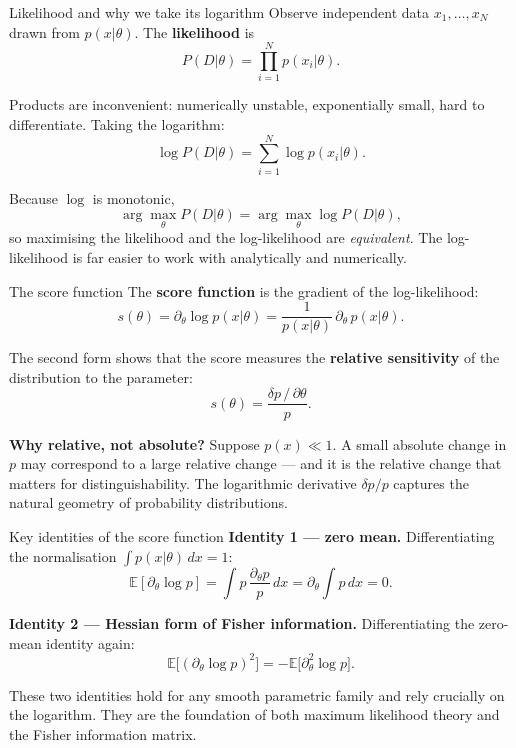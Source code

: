 \documentclass[aspectratio=169]{beamer}
\begin{document}
\begin{frame}{Likelihood and why we take its logarithm}
Observe independent data \(x_1,\dots,x_N\) drawn from \(p(x|\theta)\).
The \textbf{likelihood} is
\[
P(D|\theta)=\prod_{i=1}^N p(x_i|\theta).
\]

Products are inconvenient: numerically unstable, exponentially small,
hard to differentiate.  Taking the logarithm:
\[
\log P(D|\theta)=\sum_{i=1}^N \log p(x_i|\theta).
\]

Because \(\log\) is monotonic,
\[
\arg\max_\theta P(D|\theta)
=\arg\max_\theta \log P(D|\theta),
\]
so maximising the likelihood and the log-likelihood are \emph{equivalent}.
The log-likelihood is far easier to work with analytically and numerically.
\end{frame}


\begin{frame}{The score function}
The \textbf{score function} is the gradient of the log-likelihood:
\[
s(\theta)
=\partial_\theta \log p(x|\theta)
=\frac{1}{p(x|\theta)}\,\partial_\theta\, p(x|\theta).
\]

The second form shows that the score measures the
\textbf{relative sensitivity} of the distribution to the parameter:
\[
s(\theta)=\frac{\delta p\,/\,\partial\theta}{p}.
\]

\medskip

\textbf{Why relative, not absolute?}
Suppose \(p(x)\ll 1\).  A small absolute change in \(p\) may
correspond to a large relative change — and it is the relative
change that matters for distinguishability.
The logarithmic derivative \(\delta p/p\) captures the natural
geometry of probability distributions.
\end{frame}

\begin{frame}{Key identities of the score function}
\textbf{Identity 1 — zero mean.}
Differentiating the normalisation \(\int p(x|\theta)\,dx=1\):
\[
\mathbb{E}[\partial_\theta \log p]
=\int p\,\frac{\partial_\theta p}{p}\,dx
=\partial_\theta\!\int p\,dx=0.
\]

\textbf{Identity 2 — Hessian form of Fisher information.}
Differentiating the zero-mean identity again:
\[
\mathbb{E}\bigl[(\partial_\theta \log p)^2\bigr]
=-\mathbb{E}\bigl[\partial_\theta^2 \log p\bigr].
\]

\medskip

These two identities hold for any smooth parametric family and rely
crucially on the logarithm.  They are the foundation of both maximum
likelihood theory and the Fisher information matrix.
\end{frame}
\end{document}
